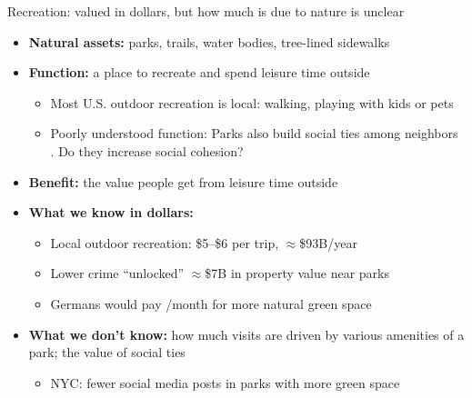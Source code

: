 \documentclass[aspectratio=169]{beamer}
\newcommand{\smallcite}[1]{\begingroup\scriptsize\citep{#1}\endgroup}
\begin{document}
\begin{frame}{Recreation: valued in dollars, but how much is due to nature is unclear}
    \small
    \begin{itemize}
        \item \textbf{Natural assets:} parks, trails, water bodies, tree-lined sidewalks
        \item \textbf{Function:} a place to recreate and spend leisure time outside
        \begin{itemize}
            \item Most U.S. outdoor recreation is local: walking, playing with kids or pets \smallcite{creelNationalValueLocal2026}
            \item Poorly understood function: Parks also build social ties among neighbors \smallcite{kazmierczakContributionLocalParks2013,petersSocialInteractionsUrban2010}. Do they increase social cohesion?
        \end{itemize}
        \item \textbf{Benefit:} the value people get from leisure time outside
        \item \textbf{What we know in dollars:}
        \begin{itemize}
            \item Local outdoor recreation: \$5--\$6 per trip, $\approx$\$93B/year \smallcite{creelNationalValueLocal2026}
            \item Lower crime ``unlocked'' $\approx$\$7B in property value near parks \smallcite{albouy_unlocking_2020}
            \item Germans would pay /month for more natural green space \smallcite{bronnmannValueNaturalnessUrban2023}
        \end{itemize}
        \item \textbf{What we don't know:} how much visits are driven by various amenities of a park; the value of social ties
        \begin{itemize}
            \item NYC: fewer social media posts in parks with more green space \smallcite{hamstead_geolocated_2018}
        \end{itemize}
    \end{itemize}
\end{frame}
\end{document}
